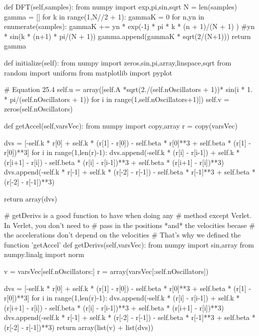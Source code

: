 \begin{enumerate}
\begin{codeexample}
\begin{VerbatimOut}{\listingFile}
    def DFT(self,samples):
        from numpy import exp,pi,sin,sqrt
        N = len(samples)
        gamma = []
        for k in range(1,N//2 + 1):
            gammaK = 0
            for n,yn in enumerate(samples):
                gammaK +=  yn * exp(-1j * pi * k * (n + 1)/(N + 1) ) #yn * sin(k * (n+1) * pi/(N + 1))
            gamma.append(gammaK * sqrt(2/(N+1)))
        return gamma



    def initialize(self):
        from numpy import zeros,sin,pi,array,linspace,sqrt
        from random import uniform
        from matplotlib import pyplot

        # Equation 25.4
        self.u = array([self.A *sqrt(2./(self.nOscillators + 1))* sin(i * 1. *  pi/(self.nOscillators + 1)) for i in range(1,self.nOscillators+1)])
        self.v = zeros(self.nOscillators)

    def getAccel(self,varsVec):
        from numpy import copy,array
        r = copy(varsVec)
        
        dvs = [-self.k * r[0] + self.k * (r[1] - r[0]) - self.beta * r[0]**3 + self.beta * (r[1] - r[0])**3]
        for i in range(1,len(r)-1):
            dvs.append(-self.k * (r[i] - r[i-1]) + self.k * (r[i+1] - r[i]) - self.beta * (r[i] - r[i-1])**3 + self.beta * (r[i+1] - r[i])**3)
        dvs.append(-self.k * r[-1] + self.k * (r[-2] - r[-1]) - self.beta * r[-1]**3 + self.beta * (r[-2] - r[-1])**3)
        
        return array(dvs)

    # getDerivs is a good function to have when doing any
    # method except Verlet.  In Verlet, you don't need to
    # pass in the positions *and* the velocities becase
    # the accelerations don't depend on the velocities
    # That's why we defined the function 'getAccel'
    def getDerivs(self,varsVec):
        from numpy import sin,array
        from numpy.linalg import norm
        
        v = varsVec[self.nOscillators:]
        r = array(varsVec[:self.nOscillators])

        dvs = [-self.k * r[0] + self.k * (r[1] - r[0]) - self.beta * r[0]**3 + self.beta * (r[1] - r[0])**3]
        for i in range(1,len(r)-1):
            dvs.append(-self.k * (r[i] - r[i-1]) + self.k * (r[i+1] - r[i]) - self.beta * (r[i] - r[i-1])**3 + self.beta * (r[i+1] - r[i])**3)
        dvs.append(-self.k * r[-1] + self.k * (r[-2] - r[-1]) - self.beta * r[-1]**3 + self.beta * (r[-2] - r[-1])**3)
        return array(list(v) + list(dvs))


\end{VerbatimOut}
\end{codeexample}
\end{enumerate}
